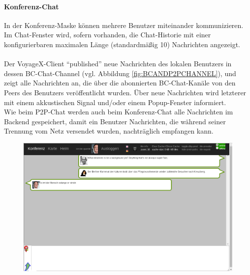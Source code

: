  
\paragraph{Konferenz-Chat}
In der Konferenz-Maske können mehrere Benutzer miteinander kommunizieren. Im Chat-Fenster wird, sofern vorhanden, die Chat-Historie mit einer konfigurierbaren maximalen Länge (standardmäßig 10) Nachrichten angezeigt.\\ \\
Der VoyageX-Client "`published"' neue Nachrichten des lokalen Benutzers in dessen BC-Chat-Channel (vgl. Abbildung \ref{fig:BCANDP2PCHANNEL}), und zeigt alle Nachrichten an, die über die abonnierten BC-Chat-Kanäle von den Peers des Benutzers veröffentlicht wurden. Über neue Nachrichten wird letzterer mit einem akkustischen Signal und/oder einem Popup-Fenster informiert.\\
Wie beim P2P-Chat werden auch beim Konferenz-Chat alle Nachrichten im Backend gespeichert, damit ein Benutzer Nachrichten, die während seiner Trennung vom Netz versendet wurden, nachträglich empfangen kann. 

  \begin{figure}[H]
  		\begin{adjustwidth}{-0.5cm}{0.5cm}
      \centering
	  \includegraphics[scale=0.6]{bilder/screenshots/conference_chat.png}\\ 
  		\end{adjustwidth}
  \end{figure}



\newpage




